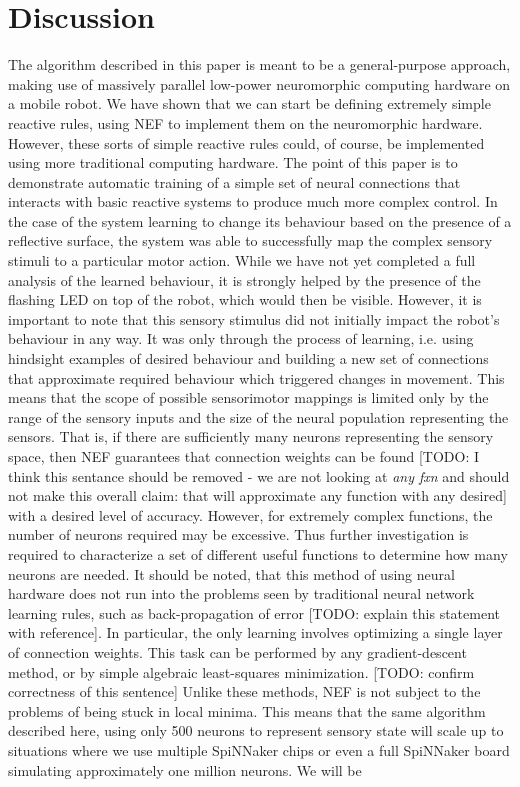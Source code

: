 \documentclass[conference]{IEEEtran}
\begin{document}
\section{Discussion}
The algorithm described in this paper is meant to be a general-purpose approach, making use of massively parallel low-power neuromorphic computing hardware on a mobile robot. We have shown that we can start be defining extremely simple reactive rules, using NEF to implement them on the neuromorphic hardware. However, these sorts of simple reactive rules could, of course, be implemented using more traditional computing hardware. The point of this paper is to demonstrate automatic training of a simple set of neural connections that interacts with basic reactive systems to produce much more complex control.
In the case of the system learning to change its behaviour based on the presence of a reflective surface, the system was able to successfully map the complex sensory stimuli to a particular motor action. While we have not yet completed a full analysis of the learned behaviour, it is strongly helped by the presence of the flashing LED on top of the robot, which would then be visible. However, it is important to note that this sensory stimulus did not initially impact the robot's behaviour in any way. It was only through the process of learning, i.e. using hindsight examples of desired behaviour and building a new set of connections that approximate required behaviour which triggered changes in  movement.
This means that the scope of possible sensorimotor mappings is limited only by the range of the sensory inputs and the size of the neural population representing the sensors. That is, if there are sufficiently many neurons representing the sensory space, then NEF guarantees that connection weights can be found [TODO: I think this sentance should be removed - we are not looking at \textit{any fxn} and should not make this overall claim: that will approximate any function with any desired] with a desired level of accuracy. However, for extremely complex functions, the number of neurons required may be excessive. Thus further investigation is required to characterize a set of different useful functions to determine how many neurons are needed. It should be noted, that this method of using neural hardware does not run into the problems seen by traditional neural network learning rules, such as back-propagation of error [TODO: explain this statement with reference]. In particular, the only learning involves optimizing a single layer of connection weights. This task can be performed by any gradient-descent method, or by simple algebraic least-squares minimization. [TODO: confirm correctness of this sentence] Unlike these methods, NEF is not subject to the problems of being stuck in local minima. This means that the same algorithm described here, using only 500 neurons to represent sensory state will scale up to situations where we use multiple SpiNNaker chips or even a full SpiNNaker board simulating approximately one million neurons. We will be
\end{document}

